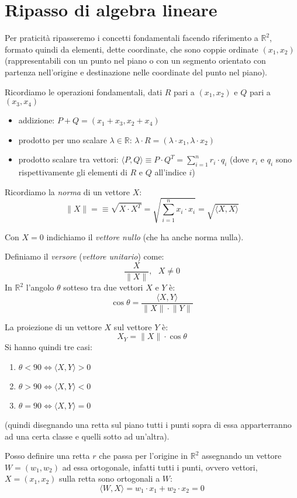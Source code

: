 \chapter{Ripasso di algebra lineare}
Per praticità ripasseremo i concetti fondamentali facendo riferimento a $\mathbb{R}^2$, formato quindi da elementi, dette coordinate, che sono coppie ordinate $(x_1,x_2)$ (rappresentabili con un punto nel piano o con un segmento orientato con partenza nell'origine e destinazione nelle coordinate del punto nel piano).
  
Ricordiamo le operazioni fondamentali, dati $R$ pari a $(x_1,x_2)$ e $Q$ pari a $(x_3,x_4)$ 
\begin{itemize}
    \item addizione: $P+Q=(x_1+x_3, x_2+x_4)$
    \item prodotto per uno scalare $\lambda\in\mathbb{R}$: $\lambda\cdot R=(\lambda\cdot x_1,\lambda\cdot x_2)$
    \item prodotto scalare tra vettori: $\langle P,Q\rangle\equiv P\cdot Q^T = \sum_{i=1}^n r_i\cdot q_i$ (dove $r_i$ e $q_i$ sono rispettivamente gli elementi di $R$ e $Q$ all'indice $i$)
\end{itemize}

Ricordiamo la \textit{norma} di un vettore $X$:$$\lVert X \rVert=\equiv\sqrt{X\cdot X^T}=\sqrt{\sum_{i=1}^n x_i\cdot x_i}=\sqrt{\langle X,X\rangle}$$

Con $X=0$ indichiamo il \textit{vettore nullo} (che ha anche norma nulla).

Definiamo il \textit{versore} (\textit{vettore unitario}) come: $$\frac{X}{\lVert X \rVert},\ \ \ X \neq 0$$ In $\mathbb{R}^2$ l'angolo $\theta$ sotteso tra due vettori $X$ e $Y$ è: $$\cos\theta=\frac{\langle X,Y\rangle}{\lVert X \rVert\cdot \lVert Y \rVert}$$

La proiezione di un vettore $X$ sul vettore $Y$ è:$$X_Y = \lVert X \rVert \cdot \cos\theta$$ Si hanno quindi tre casi:
\begin{enumerate}
    \item $\theta < 90 \iff \langle X,Y\rangle >0$
    \item $\theta > 90 \iff \langle X,Y\rangle <0$
    \item $\theta = 90 \iff \langle X,Y\rangle =0$
\end{enumerate}
(quindi disegnando una retta sul piano tutti i punti sopra di essa apparterranno ad una certa classe e quelli sotto ad un'altra).

Posso definire una retta $r$ che passa per l'origine in  $\mathbb{R}^2$ assegnando un vettore $W=(w_1,w_2)$ ad essa ortogonale, infatti tutti i punti, ovvero vettori, $X=(x_1,x_2)$ sulla retta sono ortogonali a $W$: $$\langle W,X\rangle=w_1\cdot x_1+w_2\cdot x_2=0$$

